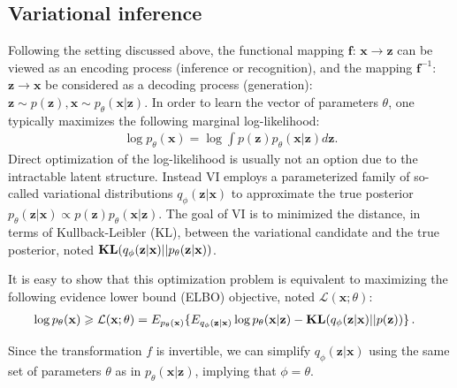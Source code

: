 \documentclass{article} %
\newcommand{\belhal}[1]{{\color{red}{\bf\sf [BK: #1]}}}
\begin{document}
\subsection{Variational inference}
Following the setting discussed above, the functional mapping $\mathbf{f}$: $\mathbf{x} \xrightarrow{} \mathbf{z}$ can be viewed as an encoding process (inference or recognition), and the mapping $\mathbf{f}^{-1}$: $\mathbf{z} \xrightarrow{} \mathbf{x}$ be considered as a decoding process (generation):
$\mathbf{z} \sim p(\mathbf{z}), \mathbf{x} \sim p_\theta(\mathbf{x}|\mathbf{z}).$
In order to learn the vector of parameters $\theta$, one typically maximizes the following marginal log-likelihood:
\begin{align*}
    \log p_\theta(\mathbf{x}) = \log \int p(\mathbf{z})  p_\theta(\mathbf{x}|\mathbf{z})d\mathbf{z}.
\end{align*}
Direct optimization of the log-likelihood is usually not an option due to the intractable latent structure. Instead VI employs a parameterized family of so-called variational distributions $q_\phi(\mathbf{z}|\mathbf{x})$ to approximate the true posterior $p_\theta(\mathbf{z}|\mathbf{x}) \varpropto  p(\mathbf{z})  p_\theta(\mathbf{x}|\mathbf{z})$.
The goal of VI is to minimized the distance, in terms of Kullback-Leibler (KL), between the variational candidate and the true posterior, noted $\textbf{\text{KL}}(q_\phi(\mathbf{z}|\mathbf{x})||p_\theta(\mathbf{z}|\mathbf{x}) )$.

It is easy to show that this optimization problem is equivalent to maximizing the following evidence lower bound (ELBO) objective, noted $\mathcal{L}(\mathbf{x}; \theta)$: 
\begin{align}\label{eq:vi_elbo}
    \log p_\theta(\mathbf{x}) \geqslant \mathcal{L}(\mathbf{x}; \theta) &= E_{p_\theta(\mathbf{x})} 
     \{E_{q_\phi(\mathbf{z}|\mathbf{x})} \log p_\theta(\mathbf{x}|\mathbf{z})  - \textbf{\text{KL}}(q_\phi(\mathbf{z}|\mathbf{x})||p(\mathbf{z}))\} \, .
\end{align}

\belhal{I do not understand the sentence below}

Since the transformation $f$ is invertible, we can simplify $q_\phi(\mathbf{z}|\mathbf{x})$ using the same set of parameters $\theta$ as in $p_\theta(\mathbf{x}|\mathbf{z})$, implying that $\phi=\theta$.
\end{document}
